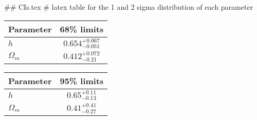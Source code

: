## CIs.tex
# latex table for the 1 and 2 sigma distribution of each parameter

\begin{tabular} { l  c}
 Parameter &  68\% limits\\
\hline
{\boldmath$h              $} & $0.654^{+0.067}_{-0.051}   $\\
{\boldmath$\Omega_m       $} & $0.412^{+0.072}_{-0.21}    $\\
\hline
\end{tabular}

\begin{tabular} { l  c}
 Parameter &  95\% limits\\
\hline
{\boldmath$h              $} & $0.65^{+0.11}_{-0.13}      $\\
{\boldmath$\Omega_m       $} & $0.41^{+0.41}_{-0.27}      $\\
\hline
\end{tabular}
